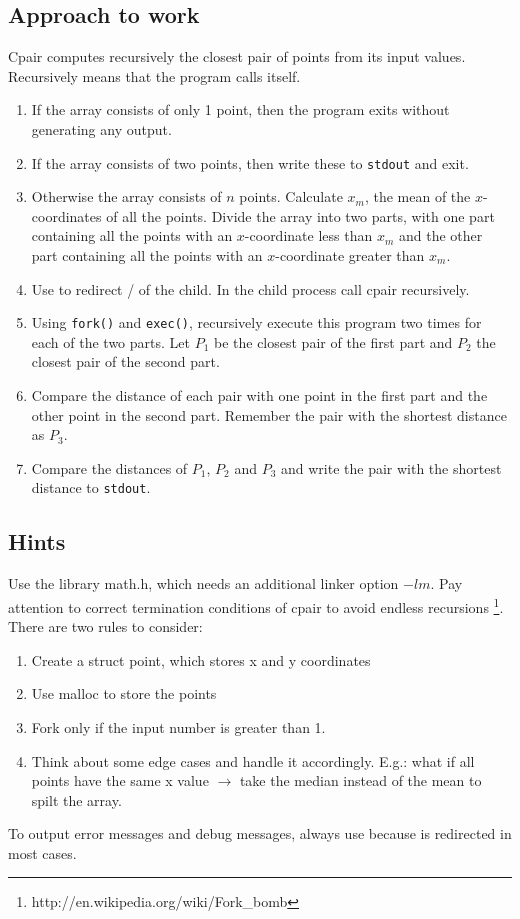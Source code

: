 \subsection*{Approach to work}
Cpair computes recursively the closest pair of points from its input values. Recursively means that the program calls itself. 
\begin{enumerate}
\item If the array consists of only 1 point, then the program exits without generating any output.

\item If the array consists of two points, then write these to \texttt{stdout} and exit.

\item Otherwise the array consists of $n$ points.
Calculate $x_m$, the mean of the $x$-coordinates of all the points.
Divide the array into two parts,
with one part containing all the points with an $x$-coordinate less than $x_m$
and the other part containing all the points with an $x$-coordinate greater than $x_m$.

 \item Use  to redirect / of the child. In the child process call cpair recursively.

\item Using \texttt{fork()} and \texttt{exec()},
recursively execute this program two times for each of the two parts.
Let $P_1$ be the closest pair of the first part and $P_2$ the closest pair of the second part.

\item Compare the distance of each pair with one point in the first part
and the other point in the second part.
Remember the pair with the shortest distance as $P_3$.

\item Compare the distances of $P_1$, $P_2$ and $P_3$
and write the pair with the shortest distance to \texttt{stdout}.
\end{enumerate}

\subsection*{Hints}
Use the library math.h, which needs an additional linker option $-lm$.
Pay attention to correct termination conditions of cpair to avoid endless recursions \footnote{http://en.wikipedia.org/wiki/Fork\_bomb}.
There are two rules to consider:
\begin{enumerate}
	\item Create a struct point, which stores x and y coordinates
	\item Use malloc to store the points
	\item Fork only if the input number is greater than 1.
	\item Think about some edge cases and handle it accordingly. E.g.: what if all points have the same x value $\rightarrow$ take the median instead of the mean to spilt the array.
\end{enumerate}

To output error messages and debug messages, always use
 because  is redirected in most cases.

\osueguidelinestwo


